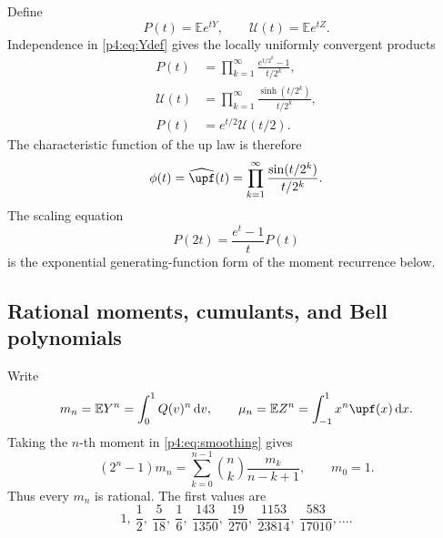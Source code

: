 \documentclass[11pt,oneside]{article}
\theoremstyle{definition}
\theoremstyle{remark}
\newcommand{\Q}{Q}
\newcommand{\E}{\mathbb E}
\newcommand{\dd}{\,\mathrm d}
\newcommand{\1}{\mathbf 1}
\begin{document}
Define
\begin{equation}\label{p4:eq:P-U-products}
 P(t)=\E e^{tY},\qquad \mathcal U(t)=\E e^{tZ}.
\end{equation}
Independence in \cref{p4:eq:Ydef} gives the locally uniformly convergent products
\begin{align}
 P(t)&=\prod_{k=1}^{\infty}
 \frac{e^{t/2^k}-1}{t/2^k},\label{p4:eq:P-product}\\
 \mathcal U(t)&=\prod_{k=1}^{\infty}
 \frac{\sinh(t/2^k)}{t/2^k},\label{p4:eq:U-product}\\
 P(t)&=e^{t/2}\mathcal U(t/2).\label{p4:eq:P-U-relation}
\end{align}
The characteristic function of the up law is therefore
\begin{equation}\label{p4:eq:phi-product}
 \phi(t)=\widehat{\upf}(t)
 =\prod_{k=1}^{\infty}\frac{\sin(t/2^k)}{t/2^k}.
\end{equation}
The scaling equation
\begin{equation}\label{p4:eq:P-pantograph}
 P(2t)=\frac{e^t-1}{t}P(t)
\end{equation}
is the exponential generating-function form of the moment recurrence below.

\subsection{Rational moments, cumulants, and Bell polynomials}

Write
\begin{equation}\label{p4:eq:mn-mun}
 m_n=\E Y^n=\int_0^1\Q(v)^n\dd v,
 \qquad
 \mu_n=\E Z^n=\int_{-1}^1x^n\upf(x)\dd x.
\end{equation}
Taking the \(n\)-th moment in \cref{p4:eq:smoothing} gives
\begin{equation}\label{p4:eq:moment-recurrence}
 (2^n-1)m_n
 =\sum_{k=0}^{n-1}\binom nk\frac{m_k}{n-k+1},
 \qquad m_0=1.
\end{equation}
Thus every \(m_n\) is rational.  The first values are
\begin{equation}\label{p4:eq:first-moments}
 1,\ \frac12,\ \frac5{18},\ \frac16,\ \frac{143}{1350},\
 \frac{19}{270},\ \frac{1153}{23814},\ \frac{583}{17010},\ldots.
\end{equation}
\end{document}
